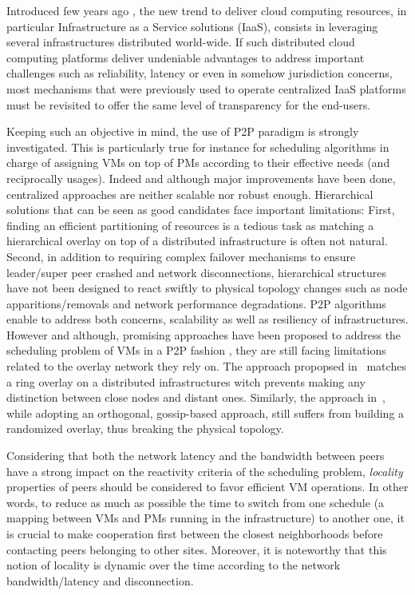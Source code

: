 Introduced few years ago \cite{greenberg:sigcomm09}, the new trend to deliver
cloud computing resources, in particular Infrastructure as a Service solutions
(IaaS), consists in leveraging several infrastructures distributed world-wide.
If such distributed cloud computing platforms deliver undeniable advantages to
address important challenges such as reliability, latency or even in somehow
jurisdiction concerns, most mechanisms that were previously used to operate
centralized IaaS platforms must be revisited to offer the same level of
transparency for the end-users.

Keeping such an objective in mind, the use of P2P paradigm is strongly 
investigated. This is particularly true for instance
for scheduling algorithms in charge of assigning VMs on top of PMs according to
their effective needs (and reciprocally usages).  Indeed and although major
improvements have been done, centralized approaches \cite{hermenier:2013} are
neither scalable nor robust enough.  Hierarchical solutions
\cite{feller:ccgrid12} that can be seen as good candidates face important
limitations: First, finding an efficient partitioning of resources is a tedious
task as matching a hierarchical overlay on top of a distributed infrastructure
is often not natural.  Second, in addition to requiring complex failover
mechanisms to ensure leader/super peer crashed and network disconnections,
hierarchical structures have not been designed to react swiftly to physical
topology changes such as node apparitions/removals and network performance
degradations.  P2P algorithms enable to address both concerns, \ie scalability
as well as resiliency of infrastructures. However and although, promising
approaches have been proposed to address the scheduling problem of VMs in a P2P
fashion \cite{quesnel:cpe2012,feller:cloudcom12}, they are still facing
limitations related to the overlay network they rely on. The approach propopsed
in~\cite{quesnel:cpe2012} matches a ring overlay  on a distributed infrastructures
witch prevents making any distinction between close nodes and distant ones.
Similarly, the approach in~\cite{feller:cloudcom12}, while adopting an
orthogonal, gossip-based approach, still suffers from building a randomized
overlay, thus breaking the physical topology.

Considering that both the network latency and the bandwidth between peers have
a strong impact on the reactivity criteria of the scheduling problem,
\emph{locality} properties of peers should be considered to favor efficient VM
operations.  In other words, to reduce as much as possible the time to switch
from one schedule (\ie a mapping between VMs and PMs running in the
infrastructure) to another one, it is crucial to make cooperation first between
the closest neighborhoods before contacting peers belonging to other sites.
Moreover, it is noteworthy that this notion of locality is dynamic over the
time according to the network bandwidth/latency and disconnection.

